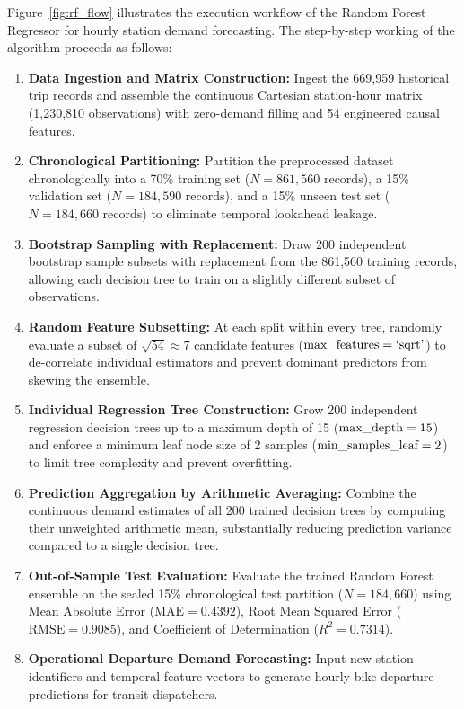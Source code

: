 \documentclass[12pt, a4paper]{article}
\renewcommand{\_}{\textunderscore\allowbreak}
\begin{document}
Figure~\ref{fig:rf_flow} illustrates the execution workflow of the Random Forest Regressor for hourly station demand forecasting. The step-by-step working of the algorithm proceeds as follows:
\begin{enumerate}
    \item \textbf{Data Ingestion and Matrix Construction:} Ingest the 669,959 historical trip records and assemble the continuous Cartesian station-hour matrix (1,230,810 observations) with zero-demand filling and 54 engineered causal features.
    \item \textbf{Chronological Partitioning:} Partition the preprocessed dataset chronologically into a 70\% training set ($N = 861,560$ records), a 15\% validation set ($N = 184,590$ records), and a 15\% unseen test set ($N = 184,660$ records) to eliminate temporal lookahead leakage.
    \item \textbf{Bootstrap Sampling with Replacement:} Draw 200 independent bootstrap sample subsets with replacement from the 861,560 training records, allowing each decision tree to train on a slightly different subset of observations.
    \item \textbf{Random Feature Subsetting:} At each split within every tree, randomly evaluate a subset of $\sqrt{54} \approx 7$ candidate features ($\text{max\_features} = \text{`sqrt'}$) to de-correlate individual estimators and prevent dominant predictors from skewing the ensemble.
    \item \textbf{Individual Regression Tree Construction:} Grow 200 independent regression decision trees up to a maximum depth of 15 ($\text{max\_depth} = 15$) and enforce a minimum leaf node size of 2 samples ($\text{min\_samples\_leaf} = 2$) to limit tree complexity and prevent overfitting.
    \item \textbf{Prediction Aggregation by Arithmetic Averaging:} Combine the continuous demand estimates of all 200 trained decision trees by computing their unweighted arithmetic mean, substantially reducing prediction variance compared to a single decision tree.
    \item \textbf{Out-of-Sample Test Evaluation:} Evaluate the trained Random Forest ensemble on the sealed 15\% chronological test partition ($N = 184,660$) using Mean Absolute Error ($\text{MAE} = 0.4392$), Root Mean Squared Error ($\text{RMSE} = 0.9085$), and Coefficient of Determination ($R^2 = 0.7314$).
    \item \textbf{Operational Departure Demand Forecasting:} Input new station identifiers and temporal feature vectors to generate hourly bike departure predictions for transit dispatchers.
\end{enumerate}
\end{document}

